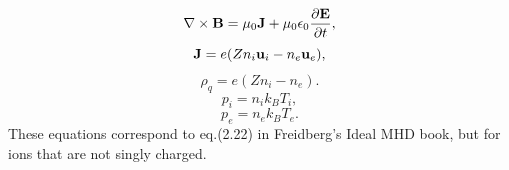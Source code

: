 \documentclass[a4paper,11pt]{report}
\begin{document}
\begin{equation}
    \label{eq:mf_2fluid_maxwell_2}
    \nabla \times \mathbf{B} = \mu_0 \mathbf{J} + \mu_0 \epsilon_0 \frac{\partial \mathbf{E}}{\partial t},
\end{equation}
\begin{equation}
    \label{eq:mf_2fluid_curr_density}
    \mathbf{J} = e (Z n_i \mathbf{u}_i - n_e \mathbf{u}_e),
\end{equation}
\begin{equation}
    \label{eq:mf_2fluid_mass_density}
    \rho_q = e (Z n_i - n_e).
\end{equation}
\begin{equation}
    \label{eq:mf_2fluid_eos_ion}
    p_i = n_i k_B T_i,
\end{equation}
\begin{equation}
    \label{eq:mf_2fluid_eos_elec}
    p_e = n_e k_B T_e.
\end{equation}
These equations correspond to eq.\@ (2.22) in Freidberg's Ideal MHD book, but for ions that are not singly charged.
\end{document}
